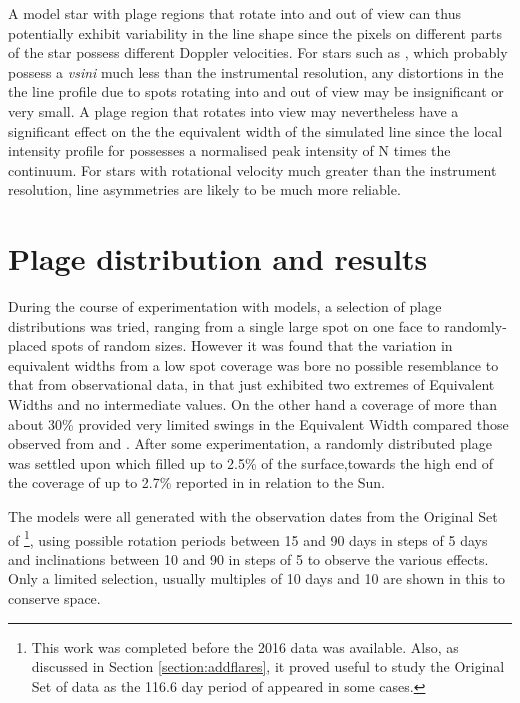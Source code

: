 A model star with plage regions that rotate into and out of view can thus potentially exhibit variability in the line
shape since the pixels on different parts of the star possess different Doppler velocities. For stars such as \prox,
which probably possess a \textit{vsini} much less than the instrumental resolution, any distortions in the the line
profile due to spots rotating into and out of view may be insignificant or very small. A plage region that rotates into
view may nevertheless have a significant effect on the the equivalent width of the simulated line since the
local intensity profile for {\ha} possesses a normalised peak intensity of N times the continuum. For stars with
rotational velocity much greater than the instrument resolution, line asymmetries are likely to be much more reliable.

\section{Plage distribution and results}
\protect\label{section:plagedists}

During the course of experimentation with models, a selection of plage distributions was tried, ranging from a single
large spot on one face to randomly-placed spots of random sizes. However it was found that the variation in equivalent
widths from a low spot coverage was bore no possible resemblance to that from observational data, in that just exhibited
two extremes of Equivalent Widths and no intermediate values. On the other hand a coverage of more than about 30\%
provided very limited swings in the Equivalent Width compared those observed from {\harps} and {\uves}. After some
experimentation, a randomly distributed plage was settled upon which filled up to 2.5\% of the surface,towards the high
end of the coverage of up to 2.7\% reported in \citet{guttenbrunner14} in relation to the Sun.

The models were all generated with the observation dates from the Original Set of {\harps}\footnote{This work was
  completed before the 2016 data was available. Also, as discussed in Section \ref{section:addflares}, it proved useful
  to study the Original Set of data as the 116.6 day period of \citet[Table 3]{suarezmascareno15} appeared in some
  cases.}, using possible rotation periods between 15 and 90 days in steps of 5 days and inclinations between
10{\degree} and 90{\degree} in steps of 5{\degree} to observe the various effects. Only a limited selection, usually
multiples of 10 days and 10{\degree} are shown in this {\paperorthesis} to conserve space.

